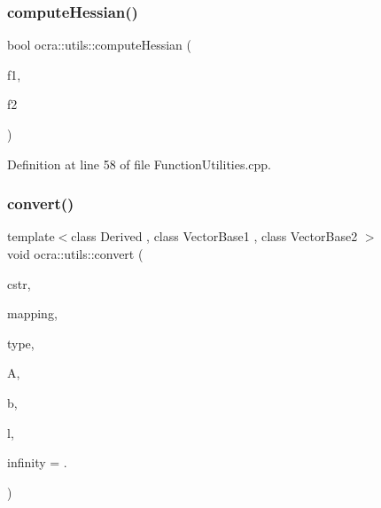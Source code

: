 \hypertarget{namespaceocra_1_1utils_a3fba5c6f77b54b0eee4cdd49f7991957}{}\label{namespaceocra_1_1utils_a3fba5c6f77b54b0eee4cdd49f7991957} 
\subsubsection{\texorpdfstring{compute\+Hessian()}{computeHessian()}}
{\footnotesize\ttfamily bool ocra\+::utils\+::compute\+Hessian (\begin{DoxyParamCaption}\item[{const \hyperlink{classocra_1_1Function}{Function} \&}]{f1,  }\item[{const \hyperlink{classocra_1_1Function}{Function} \&}]{f2 }\end{DoxyParamCaption})}



Definition at line 58 of file Function\+Utilities.\+cpp.

\hypertarget{namespaceocra_1_1utils_a5d9dfa0a2dc2197c50ba35951f19586e}{}\label{namespaceocra_1_1utils_a5d9dfa0a2dc2197c50ba35951f19586e} 
\subsubsection{\texorpdfstring{convert()}{convert()}}
{\footnotesize\ttfamily template$<$class Derived , class Vector\+Base1 , class Vector\+Base2 $>$ \\
void ocra\+::utils\+::convert (\begin{DoxyParamCaption}\item[{const \hyperlink{namespaceocra_ae8b87cf4099be3efc3b410019ad2046e}{Linear\+Constraint} \&}]{cstr,  }\item[{const std\+::vector$<$ int $>$ \&}]{mapping,  }\item[{\hyperlink{namespaceocra_abc43c1cc74267805f1cc799c4ac27051}{e\+Constraint\+Output}}]{type,  }\item[{Matrix\+Base$<$ Derived $>$ \&}]{A,  }\item[{Vector\+Base1 \&}]{b,  }\item[{Vector\+Base2 \&}]{l,  }\item[{double}]{infinity = {.} }\end{DoxyParamCaption})\hspace{0.3cm}{\ttfamily [inline]}}



